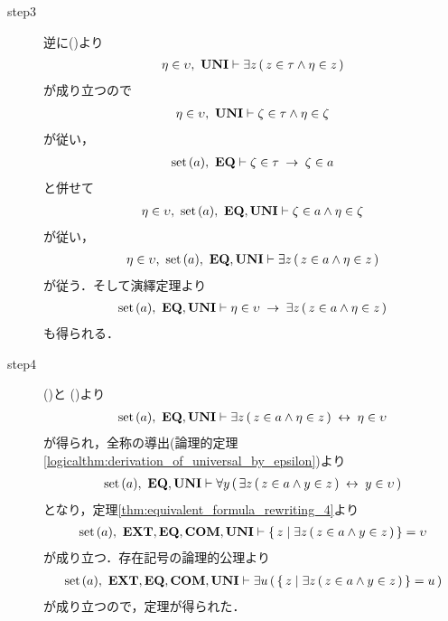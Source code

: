 \begin{sketch}
\begin{description}
			\item[step3]
				逆に()より
				\begin{align}
					\eta \in \upsilon,\ \mbox{{\bf UNI}} \vdash
					\exists z\, (\, z \in \tau \wedge \eta \in z\, )
				\end{align}
				が成り立つので
				\begin{align}
					\eta \in \upsilon,\ \mbox{{\bf UNI}} \vdash
					\zeta \in \tau \wedge \eta \in \zeta
				\end{align}
				が従い，
				\begin{align}
					\operatorname*{set}\hspace{0.15em}(a),\ \mbox{{\bf EQ}} \vdash
					\zeta \in \tau \hspace{0.25em}\rightarrow\hspace{0.25em} \zeta \in a
				\end{align}
				と併せて
				\begin{align}
					\eta \in \upsilon,\ \operatorname*{set}\hspace{0.15em}(a),\ \mbox{{\bf EQ}},\mbox{{\bf UNI}} \vdash
					\zeta \in a \wedge \eta \in \zeta
				\end{align}
				が従い，
				\begin{align}
					\eta \in \upsilon,\ \operatorname*{set}\hspace{0.15em}(a),\ \mbox{{\bf EQ}},\mbox{{\bf UNI}} \vdash
					\exists z\, (\, z \in a \wedge \eta \in z\, )
				\end{align}
				が従う．そして演繹定理より
				\begin{align}
					\operatorname*{set}\hspace{0.15em}(a),\ \mbox{{\bf EQ}},\mbox{{\bf UNI}} \vdash
					\eta \in \upsilon \hspace{0.25em}\rightarrow\hspace{0.25em} \exists z\, (\, z \in a \wedge \eta \in z\, )
					\label{fom:union_of_a_set_is_a_set_3}
				\end{align}
				も得られる．
				
			\item[step4]
				()と
				()より
				\begin{align}
					\operatorname*{set}\hspace{0.15em}(a),\ \mbox{{\bf EQ}},\mbox{{\bf UNI}} \vdash
					\exists z\, (\, z \in a \wedge \eta \in z\, ) \hspace{0.25em}\leftrightarrow\hspace{0.25em} \eta \in \upsilon
				\end{align}
				が得られ，全称の導出(論理的定理\ref{logicalthm:derivation_of_universal_by_epsilon})より
				\begin{align}
					\operatorname*{set}\hspace{0.15em}(a),\ \mbox{{\bf EQ}},\mbox{{\bf UNI}} \vdash
					\forall y\, (\, \exists z\, (\, z \in a \wedge y \in z\, ) \hspace{0.25em}\leftrightarrow\hspace{0.25em} y \in \upsilon\, )
				\end{align}
				となり，定理\ref{thm:equivalent_formula_rewriting_4}より
				\begin{align}
					\operatorname*{set}\hspace{0.15em}(a),\ \mbox{{\bf EXT}},\mbox{{\bf EQ}},\mbox{\bf COM},\mbox{{\bf UNI}} \vdash
					\{\, z \mid \exists z\, (\, z \in a \wedge y \in z\, )\, \} = \upsilon
				\end{align}
				が成り立つ．存在記号の論理的公理より
				\begin{align}
					\operatorname*{set}\hspace{0.15em}(a),\ \mbox{{\bf EXT}},\mbox{{\bf EQ}},\mbox{\bf COM},\mbox{{\bf UNI}} \vdash
					\exists u\, (\, \{\, z \mid \exists z\, (\, z \in a \wedge y \in z\, )\, \} = u\, )
				\end{align}
				が成り立つので，定理が得られた．
				\QED
		\end{description}
	\end{sketch}
	
